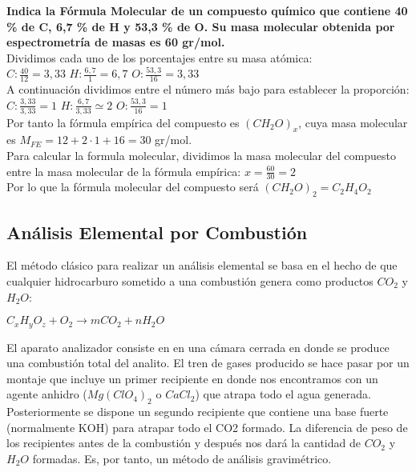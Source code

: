 \begin{exercise}
	\textbf{Indica la Fórmula Molecular de un compuesto químico que contiene 40 \% de C, 6,7 \% de H y 53,3 \% de O. Su masa molecular obtenida por espectrometría de masas es 60 gr/mol.}\\
	
	Dividimos cada uno de los porcentajes entre su masa atómica:\\
	
	$C: \frac{40}{12}=3,33$
	$H: \frac{6,7}{1}=6,7$ 
	$O: \frac{53,3}{16}=3,33$\\
	
	A continuación dividimos entre el número más bajo para establecer la proporción:\\
	
	$C: \frac{3,33}{3,33}=1$
	$H: \frac{6,7}{3,33} \simeq 2$ 
	$O: \frac{53,3}{16}=1$\\
	
	Por tanto la fórmula empírica del compuesto es $(CH_2O)_x$, cuya masa molecular es $M_{FE} = 12 + 2 \cdot 1 + 16 = 30$ gr/mol.\\
	
	Para calcular la formula molecular, dividimos la masa molecular del compuesto entre la masa molecular de la fórmula empírica:
	$x = \frac{60}{30}=2$\\
	
	Por lo que la fórmula molecular del compuesto será $(CH_2O)_2 = C_2H_4O_2$
	
\end{exercise}

\subsection{Análisis Elemental por Combustión}

El método clásico para realizar un análisis elemental se basa en el hecho de que cualquier hidrocarburo sometido a una combustión genera como productos $CO_2$ y $H_2O$:\\

\begin{center}
	$C_xH_yO_z + O_2 \rightarrow mCO_2 + nH_2O$
\end{center}

El aparato analizador consiste en en una cámara cerrada en donde se produce una combustión total del analito. El tren de gases producido se hace pasar por un montaje que incluye un primer recipiente en donde nos encontramos con un agente anhidro ($Mg(ClO_4)_2$ o $CaCl_2$) que atrapa todo el agua generada. Posteriormente se dispone un segundo recipiente que contiene una base fuerte (normalmente KOH) para atrapar todo el CO2 formado. La diferencia de peso de los recipientes antes de la combustión y después nos dará la cantidad de $CO_2$ y $H_2O$ formadas. Es, por tanto, un método de análisis gravimétrico. 

